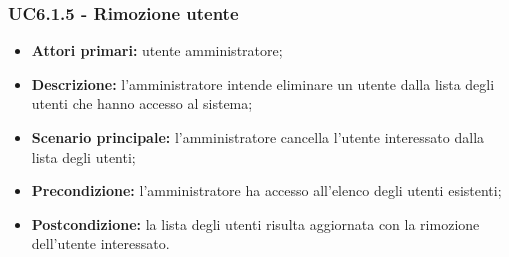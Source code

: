 \subsubsection{UC6.1.5 - Rimozione utente}
	\begin{itemize}
		\item \textbf{Attori primari:} utente amministratore;
		\item \textbf{Descrizione:} l'amministratore intende eliminare un utente dalla lista degli utenti che hanno accesso al sistema;
		\item \textbf{Scenario principale:} l'amministratore cancella l'utente interessato dalla lista degli utenti;
		\item \textbf{Precondizione:} l'amministratore ha accesso all'elenco degli utenti esistenti;
		\item \textbf{Postcondizione:} la lista degli utenti risulta aggiornata con la rimozione dell'utente interessato.
	\end{itemize}

